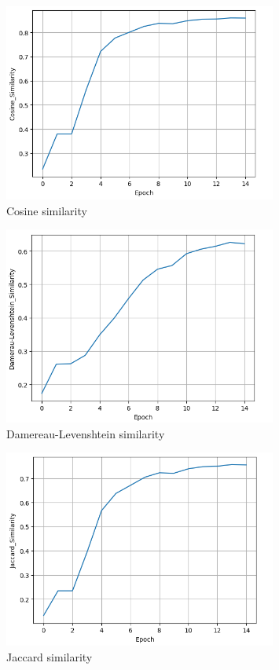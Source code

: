 \documentclass{article}
\begin{document}
\begin{figure}[H]
    \centering
    \includegraphics[width=0.8\textwidth]{../report/plots/Transformer-cosine-similarity.png}
    \caption{Cosine similarity}
    \label{fig:transformer-cosine-similarity}
\end{figure}

\begin{figure}[H]
    \centering
    \includegraphics[width=0.8\textwidth]{../report/plots/Transformer-dl-similarity.png}
    \caption{Damereau-Levenshtein similarity}
    \label{fig:transformer-dl-similarity}
\end{figure}

\begin{figure}[H]
    \centering
    \includegraphics[width=0.8\textwidth]{../report/plots/Transformer-jaccard-similarity.png}
    \caption{Jaccard similarity}
    \label{fig:transformer-jaccard-similarity}
\end{figure}
\end{document}
